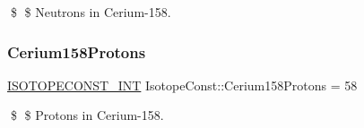 \$ \$ Neutrons in Cerium-\/158. \mbox{\label{group___isotope_const-_cerium-_ce158_ga80001586b8a8db8b035a3e100681de75}} 
\subsubsection{\texorpdfstring{Cerium158\+Protons}{Cerium158Protons}}
{\footnotesize\ttfamily \mbox{\hyperlink{group___isotope_const-_macros_ga5f18360b3e99483a35c32d789e62621c}{I\+S\+O\+T\+O\+P\+E\+C\+O\+N\+S\+T\+\_\+\+I\+NT}} Isotope\+Const\+::\+Cerium158\+Protons = 58}

\$ \$ Protons in Cerium-\/158. 